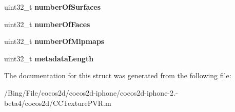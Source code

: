 \begin{DoxyCompactItemize}
\item 
\hypertarget{struct____attribute_____a5ac3822217b1b580a37c2bd6ea925ba4}{uint32\-\_\-t {\bfseries number\-Of\-Surfaces}}\label{struct____attribute_____a5ac3822217b1b580a37c2bd6ea925ba4}

\item 
\hypertarget{struct____attribute_____a8363e8d5b042e9a6c624af6986657e72}{uint32\-\_\-t {\bfseries number\-Of\-Faces}}\label{struct____attribute_____a8363e8d5b042e9a6c624af6986657e72}

\item 
\hypertarget{struct____attribute_____ae1e540d9223e26d52b6970a759ab78db}{uint32\-\_\-t {\bfseries number\-Of\-Mipmaps}}\label{struct____attribute_____ae1e540d9223e26d52b6970a759ab78db}

\item 
\hypertarget{struct____attribute_____a088aad5f567205e597492fb7979d00fc}{uint32\-\_\-t {\bfseries metadata\-Length}}\label{struct____attribute_____a088aad5f567205e597492fb7979d00fc}

\end{DoxyCompactItemize}


The documentation for this struct was generated from the following file\-:\begin{DoxyCompactItemize}
\item 
/\-Bing/\-File/cocos2d/cocos2d-\/iphone/cocos2d-\/iphone-\/2.-\/beta4/cocos2d/C\-C\-Texture\-P\-V\-R.\-m\end{DoxyCompactItemize}
